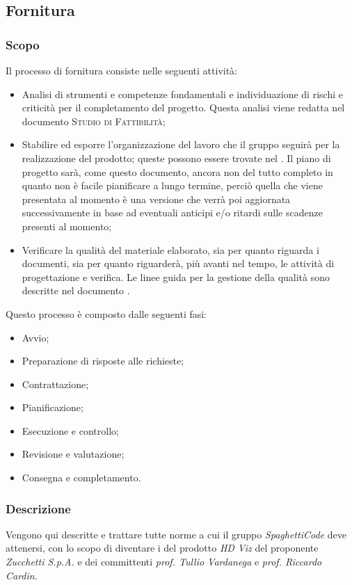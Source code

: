 \documentclass[../norme_di_progetto.tex]{subfiles}
\begin{document}
    
\subsection{Fornitura}
\subsubsection{Scopo}
Il processo di fornitura consiste nelle seguenti attività:
\begin{itemize}
    \item Analisi di strumenti e competenze fondamentali e individuazione di rischi e criticità per il completamento del progetto. Questa analisi viene redatta nel documento \textsc{Studio di Fattibilità};
    \item Stabilire ed esporre l'organizzazione del lavoro che il gruppo seguirà per la realizzazione del prodotto; queste possono essere trovate nel . Il piano di progetto sarà, come questo documento, ancora non del tutto completo in quanto non è facile pianificare a lungo termine, perciò quella che viene presentata al momento è una versione che verrà poi aggiornata successivamente in base ad eventuali anticipi e/o ritardi sulle scadenze presenti al momento;
    \item Verificare la qualità del materiale elaborato, sia per quanto riguarda i documenti, sia per quanto riguarderà, più avanti nel tempo, le attività di progettazione e verifica. Le linee guida per la gestione della qualità sono descritte nel documento .
\end{itemize}

\setlength{\parindent}{0pt}Questo processo è composto dalle seguenti fasi:
\begin{itemize}
    \item Avvio;
    \item Preparazione di risposte alle richieste;
    \item Contrattazione;
    \item Pianificazione;
    \item Esecuzione e controllo;
    \item Revisione e valutazione;
    \item Consegna e completamento.
\end{itemize}

\subsubsection{Descrizione}
Vengono qui descritte e trattare tutte norme a cui il gruppo \emph{SpaghettiCode} deve attenersi, con lo scopo di diventare i  del prodotto \emph{HD Viz} del proponente \emph{Zucchetti S.p.A.} e dei committenti \emph{prof. Tullio Vardanega} e \emph{prof. Riccardo Cardin}.
\end{document}
